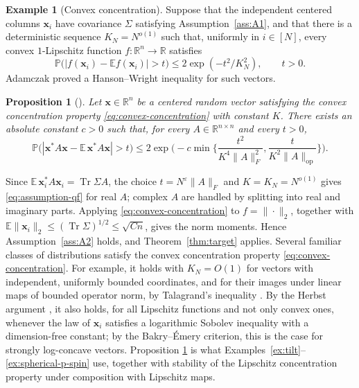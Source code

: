 \documentclass[11pt,reqno]{amsart}
\def\R{\mathbb{R}}
\def\x{\mathbf{x}}
\def\P{\mathbb{P}}
\def\E{\mathbb{E}}
\def\op{\mathrm{op}}
\def\eps{\varepsilon}
\def\Tr{\operatorname{Tr}}
\newtheorem{proposition}[theorem]{Proposition}
\theoremstyle{definition}
\newtheorem{example}[theorem]{Example}
\numberwithin{equation}{section}
\numberwithin{figure}{section}
\begin{document}
\begin{example}[Convex concentration]\label{ex:convex} Suppose that the independent centered columns $\x_i$ have covariance $\Sigma$ satisfying Assumption~\ref{ass:A1}, and that there is a deterministic sequence $K_N=N^{o(1)}$ such that, uniformly in $i\in[N]$, every convex $1$-Lipschitz function $f:\R^n\to\R$ satisfies
\begin{equation}\label{eq:convex-concentration}
 \P\big(|f(\x_i)-\E f(\x_i)|>t\big)\le 2\exp(-t^2/K_N^2), \qquad t >0.
\end{equation}
Adamczak proved a Hanson--Wright inequality for such vectors.
\begin{proposition}[{\cite[Theorem~2.3]{adamczak2015note}}]\label{prop:adamczak}
Let $\x\in\R^n$ be a centered random vector satisfying the convex concentration property \eqref{eq:convex-concentration} with constant $K$. There exists an absolute constant $c>0$ such that, for every $A\in\R^{n\times n}$ and every $t>0$,
\[
 \P\big(|\x^*A\x-\E\,\x^*A\x|>t\big)\le 2\exp\Big(-c\min\Big\{\frac{t^2}{K^4\|A\|_F^2},\frac{t}{K^2\|A\|_\op}\Big\}\Big).
\]
\end{proposition}

Since $\E\,\x_i^*A\x_i=\Tr\Sigma A$, the choice $t=N^\eps\|A\|_F$ and $K=K_N=N^{o(1)}$ gives \eqref{eq:assumption-qf} for real $A$; complex $A$ are handled by splitting into real and imaginary parts. Applying \eqref{eq:convex-concentration} to $f=\|\cdot\|_2$, together with $\E\|\x_i\|_2\le(\Tr\Sigma)^{1/2}\le\sqrt{Cn}$, gives the norm moments. Hence Assumption~\ref{ass:A2} holds, and Theorem~\ref{thm:target} applies. Several familiar classes of distributions satisfy the convex concentration property \eqref{eq:convex-concentration}. For example, it holds with $K_N=O(1)$ for vectors with independent, uniformly bounded coordinates, and for their images under linear maps of bounded operator norm, by Talagrand's inequality \cite{talagrand1996new}. By the Herbst argument \cite{bakry2014analysis}, it also holds, for all Lipschitz functions and not only convex ones, whenever the law of $\x_i$ satisfies a logarithmic Sobolev inequality with a dimension-free constant; by the Bakry--\'Emery criterion, this is the case for strongly log-concave vectors. Proposition \ref{prop:adamczak} is what Examples~\ref{ex:tilt}--\ref{ex:spherical-p-spin} use, together with stability of the Lipschitz concentration property under composition with Lipschitz maps. 
\end{example}
\end{document}
